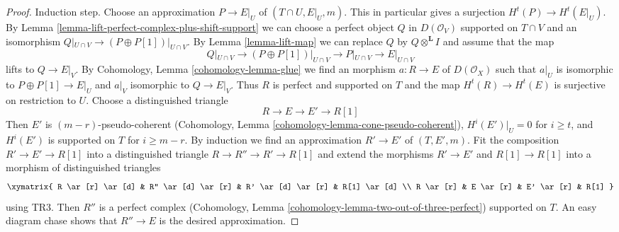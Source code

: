 \begin{proof}
\medskip\noindent
Induction step. Choose an approximation $P \to E|_U$
of $(T \cap U, E|_U, m)$. This in particular gives a surjection
$H^t(P) \to H^t(E|_U)$. By
Lemma \ref{lemma-lift-perfect-complex-plus-shift-support}
we can choose a perfect object $Q$ in $D(\mathcal{O}_V)$
supported on $T \cap V$ and an isomorphism
$Q|_{U \cap V} \to (P \oplus P[1])|_{U \cap V}$.
By Lemma \ref{lemma-lift-map} we can replace $Q$ by
$Q \otimes^\mathbf{L} I$
and assume that the map
$$
Q|_{U \cap V} \to (P \oplus P[1])|_{U \cap V}
\longrightarrow P|_{U \cap V}
\longrightarrow
E|_{U \cap V}
$$
lifts to $Q \to E|_V$. By
Cohomology, Lemma \ref{cohomology-lemma-glue}
we find an morphism $a : R \to E$ of $D(\mathcal{O}_X)$
such that $a|_U$ is isomorphic to $P \oplus P[1] \to E|_U$
and $a|_V$ isomorphic to $Q \to E|_V$.
Thus $R$ is perfect and supported on $T$
and the map $H^t(R) \to H^t(E)$ is surjective on restriction to $U$.
Choose a distinguished triangle
$$
R \to E \to E' \to R[1]
$$
Then $E'$ is $(m - r)$-pseudo-coherent
(Cohomology, Lemma \ref{cohomology-lemma-cone-pseudo-coherent}),
$H^i(E')|_U = 0$ for $i \geq t$, and
$H^i(E')$ is supported on $T$ for $i \geq m - r$.
By induction we find an approximation $R' \to E'$
of $(T, E', m)$. Fit the composition $R' \to E' \to R[1]$
into a distinguished triangle $R \to R'' \to R' \to R[1]$
and extend the morphisms $R' \to E'$ and $R[1] \to R[1]$ into
a morphism of distinguished triangles
$$
\xymatrix{
R \ar[r] \ar[d] & R'' \ar[d] \ar[r] & R' \ar[d] \ar[r] & R[1] \ar[d] \\
R \ar[r] &  E \ar[r] & E' \ar[r] & R[1]
}
$$
using TR3. Then $R''$ is a perfect complex
(Cohomology, Lemma \ref{cohomology-lemma-two-out-of-three-perfect})
supported on $T$.
An easy diagram chase shows that $R'' \to E$ is the desired
approximation.
\end{proof}
